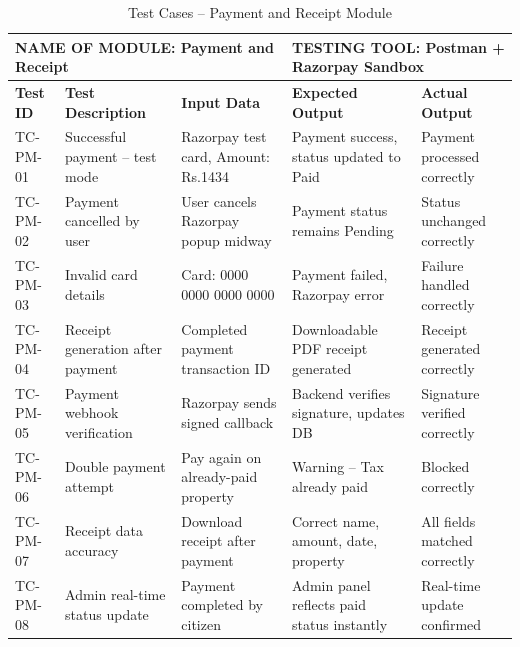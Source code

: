 \begin{table}[H]
\begin{center}
 \begin{tabular}{| m{1.2cm} | m{3.5cm} | m{2.2cm}| m{3cm}|m{3cm}| } 
\hline
\multicolumn{3}{|l|}{NAME OF MODULE: Payment and Receipt}&
\multicolumn{2}{|l|}{TESTING TOOL: Postman + Razorpay Sandbox}\\[0.8cm]
\hline
\textbf{Test ID} & \textbf{Test Description} & \textbf{Input Data} & \textbf{Expected Output} & \textbf{Actual Output} \\ 
\hline
TC-PM-01 & Successful payment -- test mode & Razorpay test card, Amount: Rs.1434 & Payment success, status updated to Paid & Payment processed correctly \\
\hline
TC-PM-02 & Payment cancelled by user & User cancels Razorpay popup midway & Payment status remains Pending & Status unchanged correctly \\
\hline
TC-PM-03 & Invalid card details & Card: 0000 0000 0000 0000 & Payment failed, Razorpay error & Failure handled correctly \\
\hline
TC-PM-04 & Receipt generation after payment & Completed payment transaction ID & Downloadable PDF receipt generated & Receipt generated correctly \\
\hline
TC-PM-05 & Payment webhook verification & Razorpay sends signed callback & Backend verifies signature, updates DB & Signature verified correctly \\
\hline
TC-PM-06 & Double payment attempt & Pay again on already-paid property & Warning -- Tax already paid & Blocked correctly \\
\hline
TC-PM-07 & Receipt data accuracy & Download receipt after payment & Correct name, amount, date, property & All fields matched correctly \\
\hline
TC-PM-08 & Admin real-time status update & Payment completed by citizen & Admin panel reflects paid status instantly & Real-time update confirmed \\
\hline
\end{tabular}
\caption{Test Cases -- Payment and Receipt Module}
\end{center}
\end{table}

